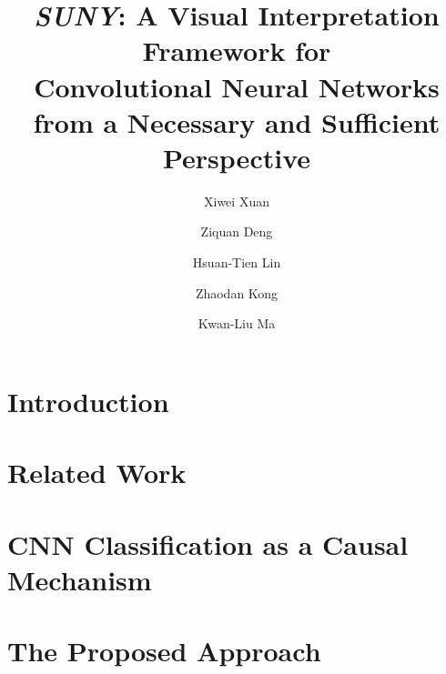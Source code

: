 \documentclass[10pt,twocolumn,letterpaper, dvipsnames, usenames, svgnames, x11names ]{article}
\newcommand{\name}{\emph{SUNY}}
\begin{document}
\title{\name{}: A Visual Interpretation Framework for \\Convolutional Neural Networks from a Necessary and Sufficient Perspective} 





\author{
Xiwei Xuan\footnotemark[2] \and Ziquan Deng\footnotemark[2] \and 
Hsuan-Tien Lin\footnotemark[4] \and
Zhaodan Kong\footnotemark[2] \and
Kwan-Liu Ma \footnotemark[2] \footnotemark[1]
}
\maketitle



\renewcommand{\thefootnote}{\fnsymbol{footnote}}






\begin{abstract}

\end{abstract}

\section{Introduction}
\label{sec:intro}

\section{Related Work}
\label{sec:related}

\section{CNN Classification as a Causal Mechanism}
\label{sec:motivation}

\section{The Proposed Approach}
\label{sec:solution}

\end{document}
